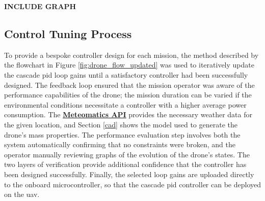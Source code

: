 \textbf{INCLUDE GRAPH}





\newpage




\subsection{Control Tuning Process}

To provide a bespoke controller design for each mission, the method described by the flowchart in Figure \ref{fig:drone_flow_updated} was used to iteratively update the cascade \gls{pid} loop gains until a satisfactory controller had been successfully designed. The feedback loop ensured that the mission operator was aware of the performance capabilities of the drone; the mission duration can be varied if the environmental conditions necessitate a controller with a higher average power consumption. The \href{https://www.meteomatics.com/}{\textbf{Meteomatics API}} provides the necessary weather data for the given location, and Section \ref{cad} shows the model used to generate the drone's mass properties. The performance evaluation step involves both the system automatically confirming that no constraints were broken, and the operator manually reviewing graphs of the evolution of the drone's states. The two layers of verification provide additional confidence that the controller has been designed successfully. Finally, the selected loop gains are uploaded directly to the onboard microcontroller, so that the cascade \gls{pid} controller can be deployed on the \gls{uav}. 

